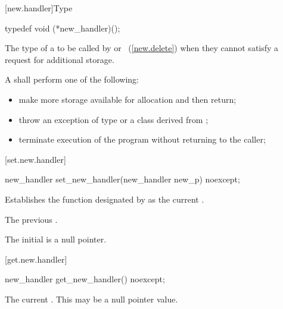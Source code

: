 [new.handler]{Type }

%
\begin{itemdecl}
typedef void (*new_handler)();
\end{itemdecl}

\begin{itemdescr}
\pnum
The type of a
to be called by
or
~(\ref{new.delete}) when they cannot satisfy a request for additional storage.

\pnum
\required
A  shall perform one of the following:

\begin{itemize}
\item
make more storage available for allocation and then return;
\item
throw an exception of type
or a class derived from
%
;
\item
terminate execution of the program without returning to the caller;
%
%
\end{itemize}
\end{itemdescr}

[set.new.handler]{}

%
\begin{itemdecl}
new_handler set_new_handler(new_handler new_p) noexcept;
\end{itemdecl}

\begin{itemdescr}
\pnum
\effects
Establishes the function designated by  as the current
.

\pnum
\returns
The previous .

\pnum
\remarks
The initial  is a null pointer.
\end{itemdescr}

[get.new.handler]{}

\begin{itemdecl}
new_handler get_new_handler() noexcept;
\end{itemdecl}

\begin{itemdescr}
\pnum
\returns The current .
\enternote This may be a null pointer value. \exitnote
\end{itemdescr}

